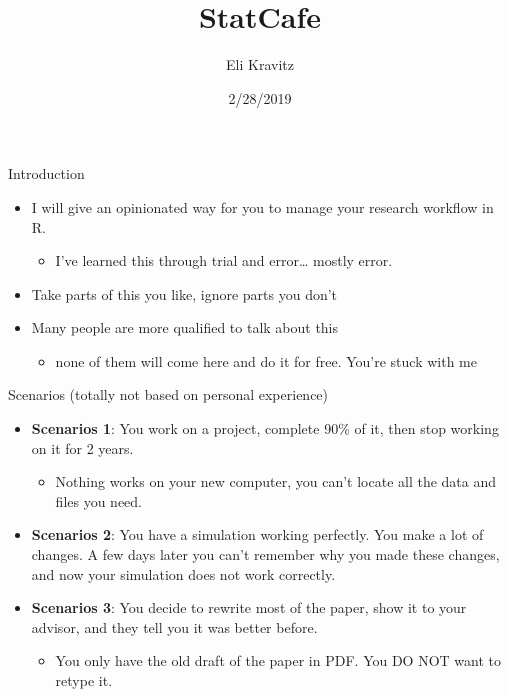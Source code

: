 \documentclass[ignorenonframetext,]{beamer}
\title{StatCafe}
\author{Eli Kravitz}
\date{2/28/2019}
\providecommand{\tightlist}{%
  \setlength{\itemsep}{0pt}\setlength{\parskip}{0pt}}
\begin{document}
\frame{\titlepage}

\begin{frame}{Introduction}
\protect\hypertarget{introduction}{}

\begin{itemize}
\item
  I will give an \alert{opinionated} way for you to manage your research
  workflow in R.

  \begin{itemize}
  \tightlist
  \item
    I’ve learned this through trial and error\ldots{} mostly error.
  \end{itemize}
\item
  Take parts of this you like, ignore parts you don’t
\item
  Many people are more qualified to talk about this

  \begin{itemize}
  \tightlist
  \item
    none of them will come here and do it for free. You’re stuck with me
  \end{itemize}
\end{itemize}

\end{frame}

\begin{frame}{Scenarios (totally not based on personal experience)}
\protect\hypertarget{scenarios-totally-not-based-on-personal-experience}{}

\begin{itemize}
\item
  \textbf{Scenarios 1}: You work on a project, complete 90\% of it, then
  stop working on it for 2 years.

  \begin{itemize}
  \tightlist
  \item
    \alert{Nothing works} on your new computer, you can’t locate all the
    data and files you need.
  \end{itemize}
\item
  \textbf{Scenarios 2}: You have a simulation working perfectly. You
  make a lot of changes. \alert{A few days later} you can’t remember why
  you made these changes, and now
  \alert{your simulation does not work correctly}.
\item
  \textbf{Scenarios 3}: You decide to rewrite most of the paper, show it
  to your advisor, and they tell you it was better before.

  \begin{itemize}
  \tightlist
  \item
    You only have the old draft of the paper in PDF. You DO NOT want to
    retype it.
  \end{itemize}
\end{itemize}

\end{frame}
\end{document}
